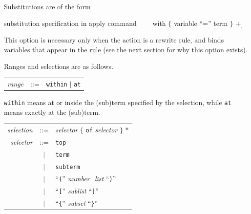 \documentclass[a4paper]{memoir}
\begin{document}
Substitutions are of the form

\begin{bsyntax} substitution specification in \texttt{}apply\textit{} command \Hline
~~~~\texttt{}with\textit{} $\{$ variable ``\/\texttt{}=\textit{}'' term $\}$ $+_,$ 
\end{bsyntax}

This option is necessary only when the action is a rewrite rule,
and binds variables that appear in the rule (see the next section
for why this option exists).

Ranges and selections are as follows.

\begin{tabular}{r c l}\index{\texttt{within}}\index{\texttt{at}}
  \textit{range} &::=& \verb|within| $|$ \verb|at|
\end{tabular}

\verb|within| means at or inside the (sub)term specified by the
selection, while \verb|at| means exactly at the (sub)term.

\begin{tabular}{r c l}\index{\texttt{of}}
  \textit{selection} &::=& \textit{selector} $\{$ \texttt{of} \textit{selector} $\}$ $*$\\
  \index{\texttt{top}}\index{\texttt{term}}\index{\texttt{subterm}}
  \textit{selector} &::=& \verb|top| \\
   &$|$& \verb|term| \\
   &$|$& \verb|subterm| \\
   &$|$& ``\verb|(|'' \textit{number\_list} ``\verb|)|'' \\
   &$|$& ``\verb|[|'' \textit{sublist} ``\verb|]|'' \\
   &$|$& ``\verb|{|'' \textit{subset} ``\verb|}|'' \\
\end{tabular}
\end{document}
